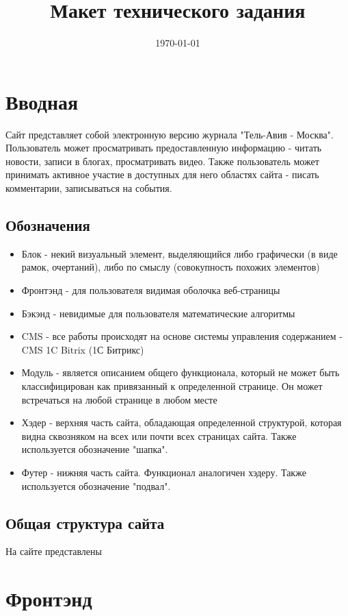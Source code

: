 \documentclass[12pt]{article} %
\title{Макет технического задания} %
\date{\today} %
\begin{document}
\maketitle

\section{Вводная}
Сайт представляет собой электронную версию журнала "Тель-Авив - Москва". Пользователь может просматривать предоставленную информацию - читать новости, записи в блогах, просматривать видео. Также пользователь может принимать активное участие в доступных для него областях сайта - писать комментарии, записываться на события.

\subsection{Обозначения}

\begin{itemize}
\item Блок - некий визуальный элемент, выделяющийся либо графически (в виде рамок, очертаний), либо по смыслу (совокупность похожих элементов)
\item Фронтэнд - для пользователя видимая оболочка веб-страницы
\item Бэкэнд - невидимые для пользователя математические алгоритмы
\item CMS - все работы происходят на основе системы управления содержанием - CMS 1C Bitrix (1С Битрикс)
\item Модуль - является описанием общего функционала, который не может быть классифицирован как привязанный к определенной странице. Он может встречаться на любой странице в любом месте
\item Хэдер - верхняя часть сайта, обладающая определенной структурой, которая видна сквозняком на всех или почти всех страницах сайта. Также используется обозначение "шапка".
\item Футер - нижняя часть сайта. Функционал аналогичен хэдеру. Также используется обозначение "подвал".
\end{itemize}

\subsection{Общая структура сайта}

На сайте представлены 

\section{Фронтэнд}
\end{document}

